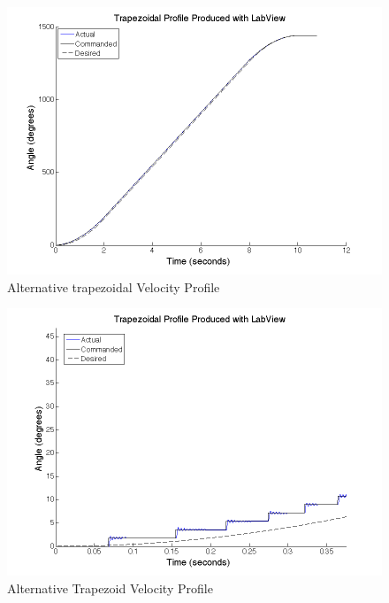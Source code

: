 \documentclass{article}
\theoremstyle{plain}
\theoremstyle{definition}
\theoremstyle{remark}
\begin{document}
\begin{figure}
\begin{center}
\includegraphics[width = 12cm]{labViewProfile.png}
\caption{Alternative trapezoidal Velocity Profile}
\label{Q4a_Alt3}
\end{center}
\end{figure}

\begin{figure}
\begin{center}
\includegraphics[width = 12cm]{labViewProfile_Detail2.png}
\caption{Alternative Trapezoid Velocity Profile}
\label{Q4a_Alt4}
\end{center}
\end{figure}
\end{document}
